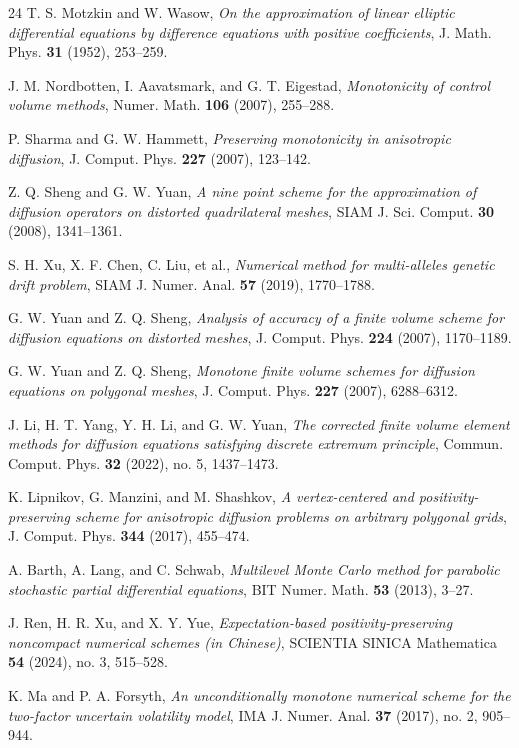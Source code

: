 \documentclass[11pt]{article}
\theoremstyle{mythm}
\theoremstyle{definition}
\begin{document}
\begin{thebibliography}{24}
		T. S. Motzkin and W. Wasow,
		\textit{On the approximation of linear elliptic differential equations by difference equations with positive coefficients},
		J. Math. Phys. \textbf{31} (1952), 253--259.
		
		J. M. Nordbotten, I. Aavatsmark, and G. T. Eigestad,
		\textit{Monotonicity of control volume methods},
		Numer. Math. \textbf{106} (2007), 255--288.
		
		P. Sharma and G. W. Hammett,
		\textit{Preserving monotonicity in anisotropic diffusion},
		J. Comput. Phys. \textbf{227} (2007), 123--142.
		
		Z. Q. Sheng and G. W. Yuan,
		\textit{A nine point scheme for the approximation of diffusion operators on distorted quadrilateral meshes},
		SIAM J. Sci. Comput. \textbf{30} (2008), 1341--1361.
		
		
		S. H. Xu, X. F. Chen, C. Liu, et al.,
		\textit{Numerical method for multi-alleles genetic drift problem},
		SIAM J. Numer. Anal. \textbf{57} (2019), 1770--1788.
		
		G. W. Yuan and Z. Q. Sheng,
		\textit{Analysis of accuracy of a finite volume scheme for diffusion equations on distorted meshes},
		J. Comput. Phys. \textbf{224} (2007), 1170--1189.
		
		G. W. Yuan and Z. Q. Sheng,
		\textit{Monotone finite volume schemes for diffusion equations on polygonal meshes},
		J. Comput. Phys. \textbf{227} (2007), 6288--6312.
		
		
		J. Li, H. T. Yang, Y. H. Li, and G. W. Yuan,
		\textit{The corrected finite volume element methods for diffusion equations satisfying discrete extremum principle},
		Commun. Comput. Phys. \textbf{32} (2022), no. 5, 1437--1473.
		
		K. Lipnikov, G. Manzini, and M. Shashkov,
		\textit{A vertex-centered and positivity-preserving scheme for anisotropic diffusion problems on arbitrary polygonal grids},
		J. Comput. Phys. \textbf{344} (2017), 455--474.
		
		A. Barth, A. Lang, and C. Schwab,
		\textit{Multilevel Monte Carlo method for parabolic stochastic partial differential equations},
		BIT Numer. Math. \textbf{53} (2013), 3--27.
		
		J. Ren, H. R. Xu, and X. Y. Yue,
		\textit{Expectation-based positivity-preserving noncompact numerical schemes (in Chinese)},
		SCIENTIA SINICA Mathematica \textbf{54} (2024), no. 3, 515--528.
		
		K. Ma and P. A. Forsyth,
		\textit{An unconditionally monotone numerical scheme for the two-factor uncertain volatility model},
		IMA J. Numer. Anal. \textbf{37} (2017), no. 2, 905--944.
		
	\end{thebibliography}
\end{document}
